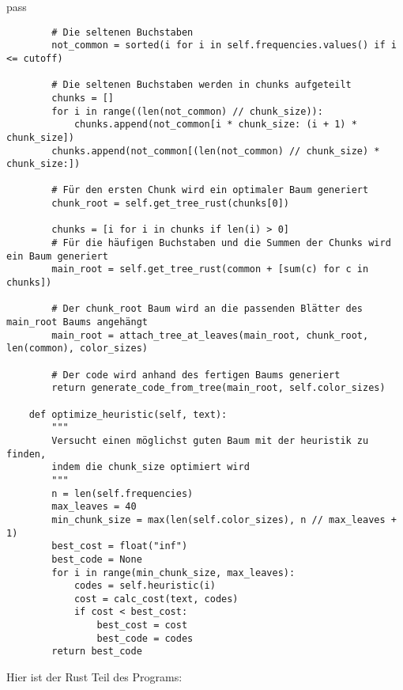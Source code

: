 pass\documentclass[a4paper,10pt,ngerman]{scrartcl}
\begin{document}
\begin{verbatim}
        # Die seltenen Buchstaben
        not_common = sorted(i for i in self.frequencies.values() if i <= cutoff)

        # Die seltenen Buchstaben werden in chunks aufgeteilt
        chunks = []
        for i in range((len(not_common) // chunk_size)):
            chunks.append(not_common[i * chunk_size: (i + 1) * chunk_size])
        chunks.append(not_common[(len(not_common) // chunk_size) * chunk_size:])

        # Für den ersten Chunk wird ein optimaler Baum generiert
        chunk_root = self.get_tree_rust(chunks[0])

        chunks = [i for i in chunks if len(i) > 0]
        # Für die häufigen Buchstaben und die Summen der Chunks wird ein Baum generiert
        main_root = self.get_tree_rust(common + [sum(c) for c in chunks])

        # Der chunk_root Baum wird an die passenden Blätter des main_root Baums angehängt
        main_root = attach_tree_at_leaves(main_root, chunk_root, len(common), color_sizes)

        # Der code wird anhand des fertigen Baums generiert
        return generate_code_from_tree(main_root, self.color_sizes)

    def optimize_heuristic(self, text):
        """
        Versucht einen möglichst guten Baum mit der heuristik zu finden,
        indem die chunk_size optimiert wird
        """
        n = len(self.frequencies)
        max_leaves = 40
        min_chunk_size = max(len(self.color_sizes), n // max_leaves + 1)
        best_cost = float("inf")
        best_code = None
        for i in range(min_chunk_size, max_leaves):
            codes = self.heuristic(i)
            cost = calc_cost(text, codes)
            if cost < best_cost:
                best_cost = cost
                best_code = codes
        return best_code
    \end{verbatim}
    Hier ist der Rust Teil des Programs:
\end{document}
